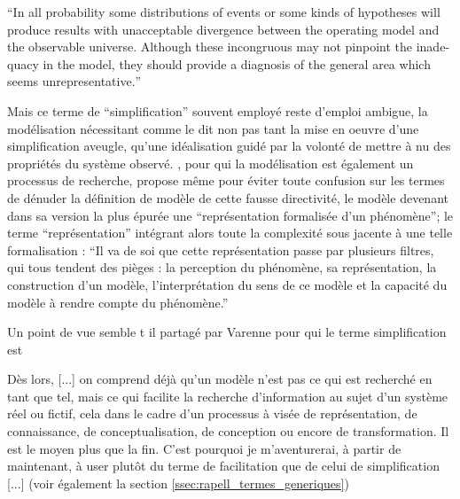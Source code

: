 \foreignquote{english}{In all probability some distributions of events or some kinds of hypotheses will produce results with unacceptable divergence between the operating model and the observable universe. Although these incongruous may not pinpoint the inadequacy in the model, they should provide a diagnosis of the general area which seems unrepresentative.} \autocite[226]{Herman1967}

Mais ce terme de \enquote{simplification} souvent employé reste d'emploi ambigue, la modélisation nécessitant comme le dit \textcite{Haggett1965} non pas tant la mise en oeuvre d'une simplification aveugle, qu'une idéalisation guidé par la volonté de mettre à nu des propriétés du système observé. \textcite{Brunet2000}, pour qui la modélisation est également un processus de recherche, propose même pour éviter toute confusion sur les termes de dénuder la définition de modèle de cette fausse directivité, le modèle devenant dans sa version la plus épurée une \enquote{représentation formalisée d'un phénomène}; le terme \enquote{représentation} intégrant alors toute la complexité sous jacente à une telle formalisation : \enquote{Il va de soi que cette représentation passe par plusieurs filtres, qui tous tendent des pièges : la perception du phénomène, sa représentation, la construction d'un modèle, l'interprétation du sens de ce modèle et la capacité du modèle à rendre compte du phénomène.}

Un point de vue semble t il partagé par Varenne pour qui le terme simplification est  

Dès lors, {[...] on comprend déjà qu’un modèle n’est pas ce qui est recherché en tant que tel, mais ce qui facilite la recherche d’information au sujet d’un système réel ou fictif, cela dans le cadre d’un processus à visée de représentation, de connaissance, de conceptualisation, de conception ou encore de transformation. Il est le moyen plus que la fin. C’est pourquoi je m’aventurerai, à partir de maintenant, à user plutôt du terme de facilitation que de celui de simplification [...]} (voir également la section \ref{ssec:rapell_termes_generiques}) \autocite{Varenne2008}

